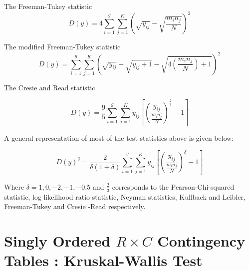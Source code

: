 \documentclass[12pt,oneside]{report}
\theoremstyle{definition}
\theoremstyle{mystyle}
\begin{document}
The Freeman-Tukey statistic
\begin{equation}
D(y)=4\sum\limits_{i=1}^{g}\sum\limits_{j=1}^{K}\left(\sqrt{y_{ij}}-\sqrt{\frac{m_{i}n_{j}}{N}}  \right)^{2} 
\end{equation}

\vspace{5mm}

The modified Freeman-Tukey statistic
\begin{equation}
D(y)=\sum\limits_{i=1}^{g}\sum\limits_{j=1}^{K}\left(\sqrt{y_{ij}}+\sqrt{y_{ij}+1}-\sqrt{4\left(\frac{m_{i}n_{j}}{N}\right)+1}  \right)^{2} 
\end{equation}

\vspace{5mm}

The Cresie and Read statistic

\begin{equation}
D(y)=\frac{9}{5}\sum\limits_{i=1}^{g}\sum\limits_{j=1}^{K}y_{ij}\left[ \left(\frac{y_{ij}}{\frac{m_{i}n_{j}}{N}} \right)^{\frac{2}{3}}-1 \right] 
\end{equation}

\vspace{5mm}

A general representation of most of the test statistics above is given below:

\begin{equation}
D(y)^{\delta}=\frac{2}{\delta(1+\delta)}\sum\limits_{i=1}^{g}\sum\limits_{j=1}^{K}y_{ij}\left[ \left(\frac{y_{ij}}{\frac{m_{i}n_{j}}{N}} \right)^{\delta}-1 \right]
\end{equation}

\vspace{5mm}

Where $\delta=1,0,-2,-1,-0.5$ and $\frac{2}{3}$ corresponds to the Pearson-Chi-squared statistic, log likelihood ratio statistic, Neyman statistics, Kullback and Leibler, Freeman-Tukey and Cresie -Read respectively.\\





\section{Singly Ordered $R \times C$ Contingency Tables : Kruskal-Wallis Test}
\end{document}
